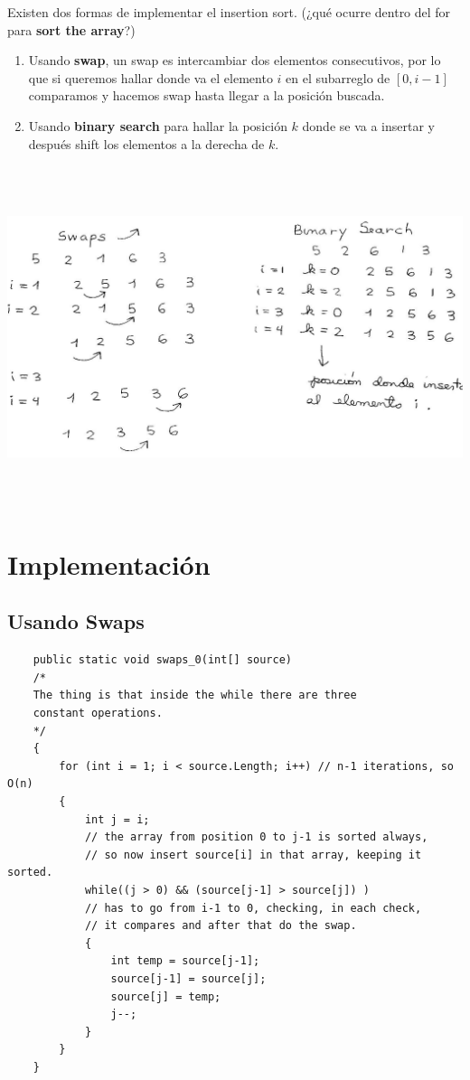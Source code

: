 \documentclass[14pt]{extarticle}
\begin{document}
Existen dos formas de implementar el insertion sort. (¿qué ocurre dentro del for para \textbf{sort the array}?)

\begin{enumerate}
    \item Usando \textbf{swap}, un swap es intercambiar dos elementos consecutivos, por lo que si queremos hallar donde va el elemento $i$ en el subarreglo de $[0,i-1]$ comparamos y hacemos swap hasta llegar a la posición buscada.
    \item Usando \textbf{binary search} para hallar la posición $k$ donde se va a insertar y después shift los elementos a la derecha de $k$.
    
  
\end{enumerate}
\begin{center}
    \includegraphics[width=20cm,height=10cm,keepaspectratio]{E}    
    \end{center} 
\section{Implementación}
\subsection{Usando Swaps}
\begin{verbatim}
    public static void swaps_0(int[] source)
    /* 
    The thing is that inside the while there are three
    constant operations.
    */
    {
        for (int i = 1; i < source.Length; i++) // n-1 iterations, so O(n)
        {
            int j = i;
            // the array from position 0 to j-1 is sorted always,
            // so now insert source[i] in that array, keeping it sorted.
            while((j > 0) && (source[j-1] > source[j]) ) 
            // has to go from i-1 to 0, checking, in each check,
            // it compares and after that do the swap.
            {                
                int temp = source[j-1]; 
                source[j-1] = source[j];
                source[j] = temp;
                j--;
            }
        }
    }
\end{verbatim}
\end{document}
